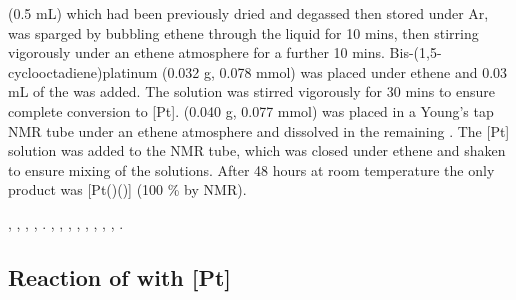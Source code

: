 
 (0.5 mL) which had been previously dried and degassed then stored under Ar, was sparged by bubbling ethene through the liquid for 10 mins, then stirring vigorously under an ethene atmosphere for a further 10 mins.  Bis-(1,5-cyclooctadiene)platinum (0.032 g, 0.078 mmol) was placed under ethene and 0.03 mL of the  was added.  The solution was stirred vigorously for 30 mins to ensure complete conversion to [Pt].  \tButhixantphos(0.040 g, 0.077 mmol) was placed in a Young's tap NMR tube under an ethene atmosphere and dissolved in the remaining .  The [Pt] solution was added to the NMR tube, which was closed under ethene and shaken to ensure mixing of the solutions.  After 48 hours at room temperature the only product was [Pt(\tButhixantphos)()] (100 \% by NMR).  

,
,
,
,
.
,
,
,
,
,
,
,
,
.


\subsection*{Reaction of \tBuxantphos{} with \texorpdfstring{[Pt]} P}


